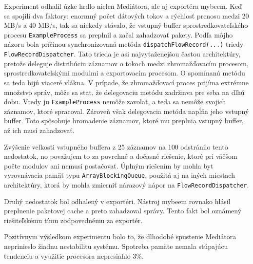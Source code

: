 Experiment odhalil úzke hrdlo nielen Mediátora, ale aj exportéra mybeem. Keď sa spojili dva faktory: 
enormný počet dátových tokov a rýchlosť prenosu medzi 20 MB/s a 40 MB/s, tak sa niekedy stávalo, že vstupný 
buffer sprostredkovateľského procesu \verb|ExampleProcess| sa preplnil a začal zahadzovať pakety. Podľa
môjho názoru bola príčinou 
synchronizovaná metóda \verb|dispatchFlowRecord(...)| triedy \verb|FlowRecordDispatcher|.
Tato trieda je asi najvyťaženejšou častou architektúry, pretože deleguje distribúciu záznamov o tokoch 
medzi zhromažďovacím procesom, sprostredkovateľskými modulmi a exportovacím procesom. O spomínanú metódu
sa teda bijú viaceré vlákna. V prípade, že zhromažďovací proces prijíma extrémne množstvo správ, môže sa stat,
že delegovaciu metódu zadržiava pre seba na dlhú dobu. Vtedy ju \verb|ExampleProcess| nemôže zavolať, a teda 
sa nemôže  svojich záznamov, ktoré spracoval. Zároveň však delegovacia metóda napĺňa jeho
vstupný buffer. Toto spôsobuje hromadenie záznamov, ktoré mu preplnia vstupný buffer, až ich musí zahadzovať.

Zvýšenie veľkosti vstupného buffera z 25 záznamov na 100 odstránilo tento nedostatok, no považujem to za 
povrchné a dočasné riešenie, ktoré pri väčšom počte modulov ani nemusí postačovať. Úplným riešením by mohla 
byt vyrovnávacia pamäť typu \verb|ArrayBlockingQueue|, použitá aj na iných miestach architektúry, ktorá 
by mohla zmierniť nárazový nápor na \verb|FlowRecordDispatcher|.

Druhý nedostatok bol odhalený v exportéri. Nástroj mybeem rovnako hlásil preplnenie paketovej cache a 
preto zahadzoval správy. Tento fakt bol oznámený riešiteľskému tímu zodpovednému za exportér.

Pozitívnym výsledkom experimentu bolo to, že dlhodobé spustenie Mediátora neprinieslo žiadnu nestabilitu 
systému. Spotreba pamäte nemala stúpajúcu tendenciu a využitie procesora nepresiahlo 3\%.




























